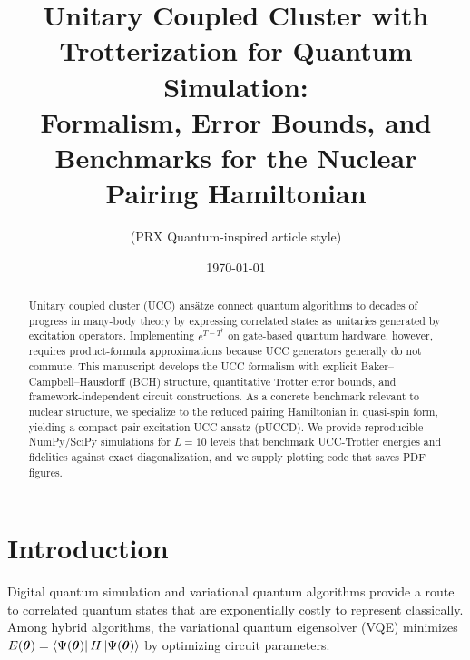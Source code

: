\documentclass[11pt]{article}
\title{\bf Unitary Coupled Cluster with Trotterization for Quantum Simulation:\\
  Formalism, Error Bounds, and Benchmarks for the Nuclear Pairing Hamiltonian}
\author{(PRX Quantum-inspired article style)}
\date{\today}
\begin{document}
\maketitle

\begin{abstract}
  Unitary coupled cluster (UCC) ans\"atze connect quantum algorithms to decades of progress in
  many-body theory by expressing correlated states as unitaries generated by excitation operators.
  Implementing $e^{T-T^\dagger}$ on gate-based quantum hardware, however, requires product-formula
  approximations because UCC generators generally do not commute.
  This manuscript develops the UCC formalism with explicit Baker--Campbell--Hausdorff (BCH) structure,
  quantitative Trotter error bounds, and framework-independent circuit constructions.
  As a concrete benchmark relevant to nuclear structure, we specialize to the reduced pairing
  Hamiltonian in quasi-spin form, yielding a compact pair-excitation UCC ansatz (pUCCD).
  We provide reproducible NumPy/SciPy simulations for $L=10$ levels that benchmark UCC-Trotter energies
  and fidelities against exact diagonalization, and we supply plotting code that saves PDF figures.
\end{abstract}

\vspace{0.5em}
\noindent{}
\vspace{1.0em}

\tableofcontents

\section{Introduction}
Digital quantum simulation and variational quantum algorithms provide a route to correlated quantum
states that are exponentially costly to represent classically.
Among hybrid algorithms, the variational quantum eigensolver (VQE) minimizes
$E(\bm{\theta})=\bra{\Psi(\bm{\theta})}H\ket{\Psi(\bm{\theta})}$ by optimizing circuit parameters.
\end{document}
